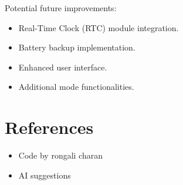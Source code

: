 \documentclass{article}
\begin{document}
Potential future improvements:
\begin{itemize}
    \item Real-Time Clock (RTC) module integration.
    \item Battery backup implementation.
    \item Enhanced user interface.
    \item Additional mode functionalities.
\end{itemize}

\section{References}
\begin{itemize}
    \item Code by rongali charan
    \item AI suggestions
\end{itemize}
\end{document}
